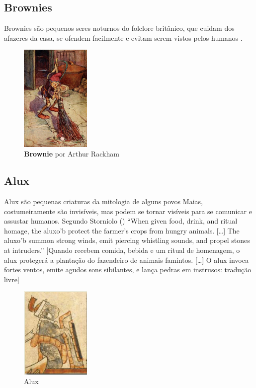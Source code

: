 \subsection{Brownies}

Brownies são pequenos seres noturnos do folclore britânico, que cuidam dos
afazeres da casa, se ofendem facilmente e evitam serem vistos pelos humanos
\cite{britannica_2011}\cite{carolyn_2016}.

\begin{figure}[!htb]
    \caption{\label{fig_brownie}\textbf{Brownie} por Arthur Rackham }
    \begin{center} \includegraphics[width=0.3\textwidth]{imagens/brownie.jpg}
    \end{center}  \end{figure}


\subsection{Alux}

Alux são pequenas criaturas da mitologia de alguns povos Maias, costumeiramente
são invisíveis, mas podem se tornar visíveis para se comunicar e assustar
humanos. Segundo Storniolo (\citeyear{storniolo2009out}) ``When given food,
drink, and ritual homage, the aluxo'b protect the farmer’s crops from hungry
animals. [\ldots] The aluxo'b summon strong winds, emit piercing whistling
sounds, and propel stones at intruders.'' [Quando recebem comida, bebida e
um ritual de homenagem, o alux protegerá a plantação do fazendeiro de
animais famintos. [\ldots] O alux invoca fortes ventos, emite agudos sons
sibilantes, e lança pedras em instrusos: tradução livre]


\begin{figure}[!htb] \caption{\label{fig_alux}Alux} \begin{center}
\includegraphics[width=0.3\textwidth]{imagens/alux.jpg} \end{center}
 \end{figure}

